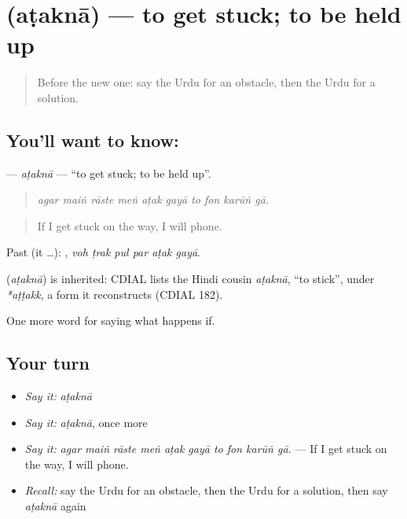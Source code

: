 \section[\texorpdfstring{\ur{اٹکنا} (aṭaknā)}{اٹکنا (aṭaknā)}]{ (aṭaknā) — to get stuck; to be held up}

\label{lesson:UR-C368-atakna}



\begin{quote}
Before the new one: say the Urdu for an obstacle, then the Urdu for a solution.
\end{quote}

\subsection*{You'll want to know: }
\textbf{} — \emph{aṭaknā} — \textquotedblleft{}to get stuck; to be held up\textquotedblright{}.

\begin{quote}
         
\end{quote}

\begin{quote}
\emph{agar maiṅ rāste meṅ aṭak gayā to fon karūṅ gā.}
\end{quote}

\begin{quote}
If I get stuck on the way, I will phone.
\end{quote}

Past (it …):      , \emph{voh ṭrak pul par aṭak gayā}.

\begin{cousinweb}
\textbf{} (\emph{aṭaknā}) is inherited: CDIAL lists the Hindi cousin \emph{aṭaknā}, \textquotedblleft{}to stick\textquotedblright{}, under \emph{*aṭṭakk}, a form it reconstructs (CDIAL 182).
\end{cousinweb}

\begin{grammarlens}[title={What you've built}]
One more word for saying what happens if.
\end{grammarlens}

\subsection*{Your turn}
\begin{itemize}
\raggedright
  \item \emph{Say it:} \emph{aṭaknā}
  \item \emph{Say it:} \emph{aṭaknā}, once more
  \item \emph{Say it:} \emph{agar maiṅ rāste meṅ aṭak gayā to fon karūṅ gā.} — If I get stuck on the way, I will phone.
  \item \emph{Recall:} say the Urdu for an obstacle, then the Urdu for a solution, then say \emph{aṭaknā} again
\end{itemize}

